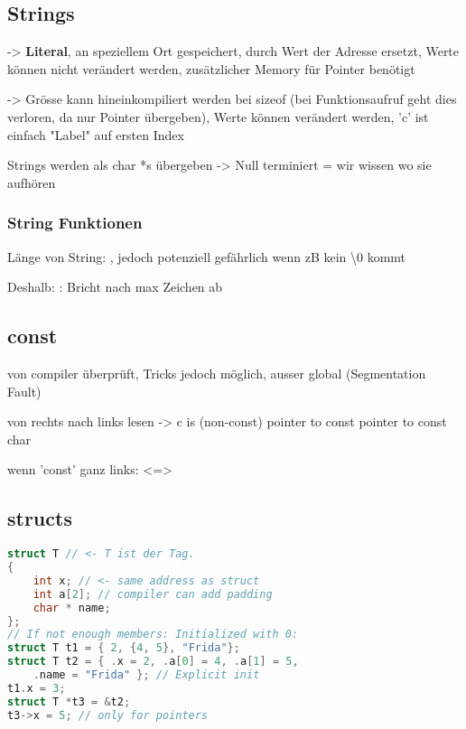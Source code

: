 \begin{multicols*}{4}
\subsection{Strings}
 -> \textbf{Literal}, an speziellem Ort gespeichert, durch Wert der Adresse ersetzt, Werte können nicht verändert werden, zusätzlicher Memory für Pointer benötigt

 -> Grösse kann hineinkompiliert werden bei sizeof (bei Funktionsaufruf geht dies verloren, da nur Pointer übergeben), Werte können verändert werden, 'c' ist einfach "Label" auf ersten Index

Strings werden als char *s übergeben -> Null terminiert = wir wissen wo sie aufhören

\subsubsection{String Funktionen}
Länge von String: , jedoch potenziell gefährlich wenn zB kein \textbackslash0 kommt

Deshalb: : Bricht nach max Zeichen ab


\subsection{const}
von compiler überprüft, Tricks jedoch möglich, ausser global (Segmentation Fault)\vspace{2pt}

von rechts nach links lesen
 -> c is (non-const) pointer to const pointer to const char

wenn 'const' ganz links:  <=> 

\subsection{structs}
\begin{lstlisting}[language=c]
struct T // <- T ist der Tag.
{
    int x; // <- same address as struct
    int a[2]; // compiler can add padding
    char * name;
};
// If not enough members: Initialized with 0:
struct T t1 = { 2, {4, 5}, "Frida"};
struct T t2 = { .x = 2, .a[0] = 4, .a[1] = 5,
    .name = "Frida" }; // Explicit init
t1.x = 3;
struct T *t3 = &t2;
t3->x = 5; // only for pointers
\end{lstlisting}


\end{multicols*}
